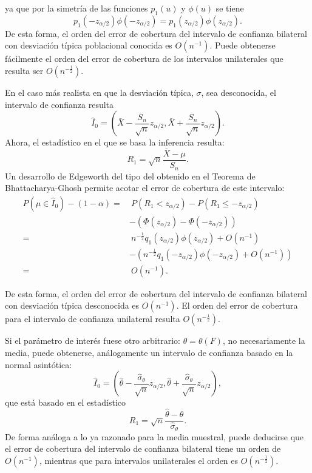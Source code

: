 \documentclass[]{book}
\theoremstyle{definition}
\theoremstyle{definition}
\theoremstyle{definition}
\theoremstyle{remark}
\begin{document}
ya que por la simetría de las funciones \(p_1\left( u \right)\) y
\(\phi \left( u \right)\) se tiene
\[p_1\left( -z_{\alpha /2} \right) \phi \left( -z_{\alpha /2} \right)
=p_1\left( z_{\alpha /2} \right) \phi \left( z_{\alpha /2} \right).\] De
esta forma, el orden del error de cobertura del intervalo de confianza
bilateral con desviación típica poblacional conocida es
\(O\left( n^{-1} \right)\). Puede obtenerse fácilmente el orden del
error de cobertura de los intervalos unilaterales que resulta ser
\(O\left( n^{-\frac{1}{2}} \right)\).

En el caso más realista en que la desviación típica, \(\sigma\), sea
desconocida, el intervalo de confianza resulta \[\hat{I}_{0}=\left( 
\bar{X}-\frac{S_n}{\sqrt{n}}z_{\alpha /2},\bar{X}+\frac{S_n}{
\sqrt{n}}z_{\alpha /2} \right).\] Ahora, el estadístico en el que se
basa la inferencia resulta: \[R_1=\sqrt{n}\frac{\bar{X}-\mu }{S_n}.\] Un
desarrollo de Edgeworth del tipo del obtenido en el Teorema de
Bhattacharya-Ghosh permite acotar el error de cobertura de este
intervalo: \[\begin{aligned}
P\left( \mu \in \hat{I}_{0} \right) -\left( 1-\alpha \right) =&\ P\left(
R_1<z_{\alpha /2} \right) -P\left( R_1\leq -z_{\alpha /2} \right) \\
&-\left( \Phi \left( z_{\alpha /2} \right) -\Phi \left( -z_{\alpha
/2} \right) \right) \\
=&\ n^{-\frac{1}{2}}q_1\left( z_{\alpha /2} \right) \phi \left( z_{\alpha
/2} \right) +O\left( n^{-1} \right) \\
&-\left( n^{-\frac{1}{2}}q_1\left( -z_{\alpha /2} \right) \phi \left(
-z_{\alpha /2} \right) +O\left( n^{-1} \right) \right) \\
=&\ O\left( n^{-1} \right).
\end{aligned}\]

De esta forma, el orden del error de cobertura del intervalo de
confianza bilateral con desviación típica desconocida es
\(O\left( n^{-1} \right)\). El orden del error de cobertura para el
intervalo de confianza unilateral resulta
\(O\left( n^{-\frac{1}{2}} \right)\).

Si el parámetro de interés fuese otro arbitrario:
\(\theta =\theta \left( F \right)\), no necesariamente la media, puede
obtenerse, análogamente un intervalo de confianza basado en la normal
asintótica:
\[\hat{I}_{0}=\left( \hat{\theta}-\frac{\hat{\sigma}_{\theta }}{\sqrt{n}}
z_{\alpha /2},\hat{\theta}+\frac{\hat{\sigma}_{\theta }}{\sqrt{n}}
z_{\alpha/2} \right),\] que está basado en el estadístico
\[R_1=\sqrt{n}\frac{\hat{\theta}-\theta }{\hat{\sigma}_{\theta }}.\] De
forma análoga a lo ya razonado para la media muestral, puede deducirse
que el error de cobertura del intervalo de confianza bilateral tiene un
orden de \(O\left( n^{-1} \right)\), mientras que para intervalos
unilaterales el orden es \(O\left( n^{-\frac{1}{2}} \right)\).
\end{document}

